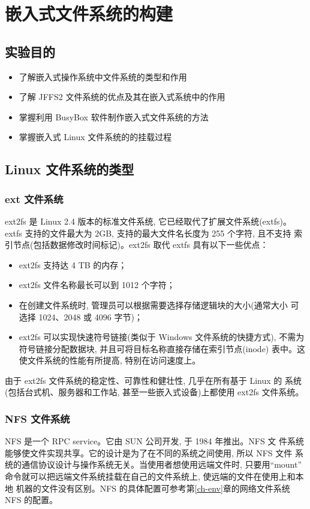 \chapter{嵌入式文件系统的构建}\label{ch-fs}

\section{实验目的}
\begin{itemize}\itemsep=-3pt
  \item 了解嵌入式操作系统中文件系统的类型和作用
  \item 了解 JFFS2 文件系统的优点及其在嵌入式系统中的作用
  \item 掌握利用 BusyBox 软件制作嵌入式文件系统的方法
  \item 掌握嵌入式 Linux 文件系统的的挂载过程
\end{itemize}

\section{Linux 文件系统的类型}
\subsection{ext 文件系统}
	ext2fs 是 Linux 2.4 版本的标准文件系统, 它已经取代了扩展文件系统(extfs)。
extfs 支持的文件最大为 2GB, 支持的最大文件名长度为 255 个字符, 且不支持
索引节点(包括数据修改时间标记)。ext2fs 取代 extfs 具有以下一些优点：
\begin{itemize}\itemsep=-3pt
  \item ext2fs 支持达 4 TB 的内存；
  \item ext2fs 文件名称最长可以到 1012 个字符；
  \item 在创建文件系统时, 管理员可以根据需要选择存储逻辑块的大小(通常大小
		可选择 1024、2048 或 4096 字节)；
  \item ext2fs 可以实现快速符号链接(类似于 Windows 文件系统的快捷方式), 
		不需为符号链接分配数据块, 并且可将目标名称直接存储在索引节点(inode)
		表中。这使文件系统的性能有所提高, 特别在访问速度上。
\end{itemize}
	由于 ext2fs 文件系统的稳定性、可靠性和健壮性, 几乎在所有基于 Linux 的
系统(包括台式机、服务器和工作站, 甚至一些嵌入式设备)上都使用 ext2fs 文件系统。

\subsection{NFS 文件系统}
	NFS 是一个 RPC service。它由 SUN 公司开发, 于 1984 年推出。NFS 文
件系统能够使文件实现共享。它的设计是为了在不同的系统之间使用, 所以 NFS 文件
系统的通信协议设计与操作系统无关。当使用者想使用远端文件时, 只要用``mount''
命令就可以把远端文件系统挂载在自己的文件系统上, 使远端的文件在使用上和本地
机器的文件没有区别。NFS 的具体配置可参考第\ref{ch-env}章的网络文件系统 NFS
的配置。

